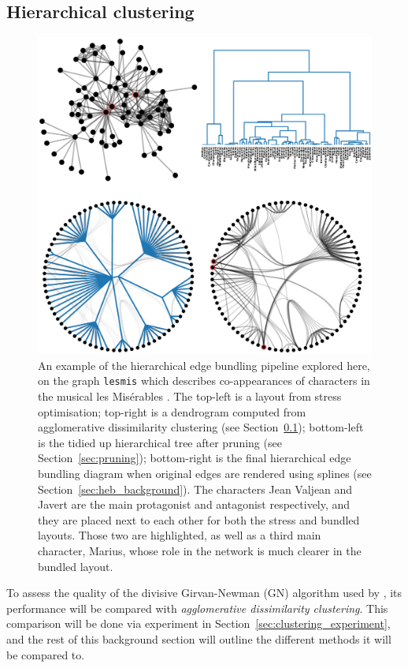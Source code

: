 \subsection{Hierarchical clustering}
\label{sec:dissimilarities}
\begin{figure}
  \centering
  \includegraphics[width=\textwidth]{power/lesmis.pdf}
  \caption[A hierarchical edge bundling pipeline]{An example of the hierarchical edge bundling pipeline explored here, on the graph \texttt{lesmis} which describes co-appearances of characters in the musical les Mis\'erables \citep{Knuth1993}. The top-left is a layout from stress optimisation; top-right is a dendrogram computed from agglomerative dissimilarity clustering (see Section~\ref{sec:dissimilarities}); bottom-left is the tidied up hierarchical tree after pruning (see Section~\ref{sec:pruning}); bottom-right is the final hierarchical edge bundling diagram when original edges are rendered using splines (see Section~\ref{sec:heb_background}).
  The characters Jean Valjean and Javert are the main protagonist and antagonist respectively, and they are placed next to each other for both the stress and bundled layouts. Those two are highlighted, as well as a third main character, Marius, whose role in the network is much clearer in the bundled layout.}
  \label{fig:lesmis}
\end{figure}

To assess the quality of the divisive Girvan-Newman (GN) algorithm used by \citet{Jia2011}, its performance will be compared with \emph{agglomerative dissimilarity clustering}. This comparison will be done via experiment in Section~\ref{sec:clustering_experiment}, and the rest of this background section will outline the different methods it will be compared to.

